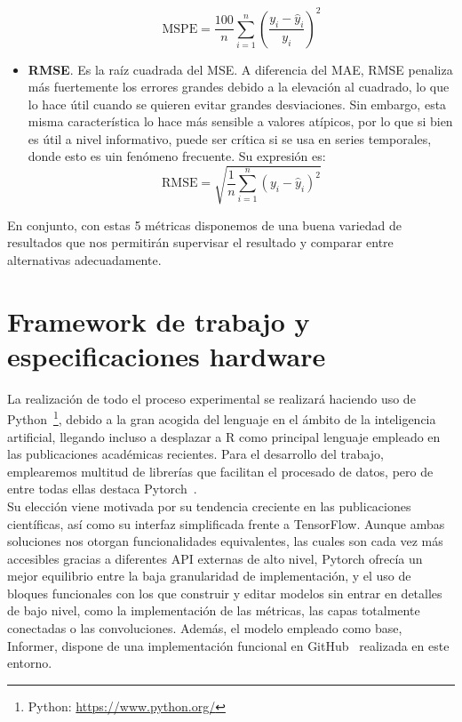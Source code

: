 \begin{itemize}
	$$
	\mathrm{MSPE} = \frac{100}{n} \sum_{i=1}^n \left( \frac{y_i - \hat{y}_i}{y_i} \right)^2
	$$
	
	\item \textbf{RMSE}. Es la raíz cuadrada del MSE. A diferencia del MAE, RMSE penaliza más fuertemente los errores grandes debido a la elevación al cuadrado, lo que lo hace útil cuando se quieren evitar grandes desviaciones. Sin embargo, esta misma característica lo hace más sensible a valores atípicos, por lo que si bien es útil a nivel informativo, puede ser crítica si se usa en series temporales, donde esto es uin fenómeno frecuente. Su expresión es:
	$$
	\mathrm{RMSE} = \sqrt{\frac{1}{n} \sum_{i=1}^n (y_i - \hat{y}_i)^2}
	$$
\end{itemize}

En conjunto, con estas 5 métricas disponemos de una buena variedad de resultados que nos permitirán supervisar el resultado y comparar entre alternativas adecuadamente.


\section{Framework de trabajo y especificaciones hardware}

La realización de todo el proceso experimental se realizará haciendo uso de Python~\footnote{Python: \url{https://www.python.org/}}, debido a la gran acogida del lenguaje en el ámbito de la inteligencia artificial, llegando incluso a desplazar a R como principal lenguaje empleado en las publicaciones académicas recientes. Para el desarrollo del trabajo, emplearemos multitud de librerías que facilitan el procesado de datos, pero de entre todas ellas destaca Pytorch~\cite{paszke2019pytorchimperativestylehighperformance}.\\

Su elección viene motivada por su tendencia creciente en las publicaciones científicas, así como su interfaz simplificada frente a TensorFlow. Aunque ambas soluciones nos otorgan funcionalidades equivalentes, las cuales son cada vez más accesibles gracias a diferentes API externas de alto nivel, Pytorch ofrecía un mejor equilibrio entre la baja granularidad de implementación, y el uso de bloques funcionales con los que construir y editar modelos sin entrar en detalles de bajo nivel, como la implementación de las métricas, las capas totalmente conectadas o las convoluciones. Además, el modelo empleado como base, Informer, dispone de una implementación funcional en GitHub~\cite{zhouhaoyi2020informer} realizada en este entorno.\\

